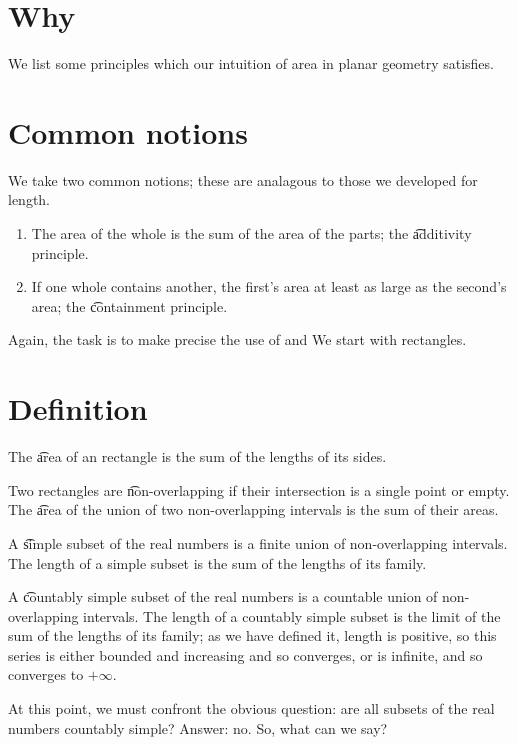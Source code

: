 

\section*{Why}

We list some principles which our intuition of area in planar geometry satisfies.

\section*{Common notions}

We take two common notions; these are analagous to those we developed for length.
  \begin{enumerate}
    \item The area of the whole is the sum of the area of the parts; the \t{additivity principle}.
    \item If one whole contains another, the first's area at least as large as the second's area; the \t{containment principle}.
  \end{enumerate}

Again, the task is to make precise the use of   and  We start with rectangles.

\section*{Definition}

The \t{area} of an rectangle is the sum of the lengths of its sides.

Two rectangles are \t{non-overlapping} if their intersection is a single point or empty.
The \t{area} of the union of two non-overlapping intervals is the sum of their areas.

A \t{simple} subset of the real numbers is a finite union of non-overlapping intervals.
The length of a simple subset is the sum of the lengths of its family.

A \t{countably simple} subset of the real numbers is a countable union of non-overlapping intervals.
The length of a countably simple subset is the limit of the sum of the lengths
of its family; as we have defined it, length is positive, so this series is either bounded and increasing and so converges, or is infinite, and so converges to $+\infty$.

At this point, we must confront the obvious question: are all subsets of the real numbers countably simple?
Answer: no.
So, what can we say?

